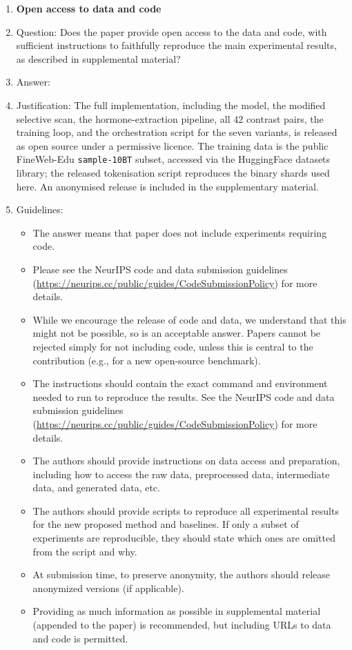 \begin{enumerate}
\item {\bf Open access to data and code}
    \item[] Question: Does the paper provide open access to the data and code, with sufficient instructions to faithfully reproduce the main experimental results, as described in supplemental material?
    \item[] Answer: \answerYes{}
    \item[] Justification: The full implementation, including the model, the modified selective scan, the hormone-extraction pipeline, all 42 contrast pairs, the training loop, and the orchestration script for the seven variants, is released as open source under a permissive licence. The training data is the public FineWeb-Edu \texttt{sample-10BT} subset, accessed via the HuggingFace datasets library; the released tokenisation script reproduces the binary shards used here. An anonymised release is included in the supplementary material.
    \item[] Guidelines:
    \begin{itemize}
        \item The answer \answerNA{} means that paper does not include experiments requiring code.
        \item Please see the NeurIPS code and data submission guidelines (\url{https://neurips.cc/public/guides/CodeSubmissionPolicy}) for more details.
        \item While we encourage the release of code and data, we understand that this might not be possible, so \answerNo{} is an acceptable answer. Papers cannot be rejected simply for not including code, unless this is central to the contribution (e.g., for a new open-source benchmark).
        \item The instructions should contain the exact command and environment needed to run to reproduce the results. See the NeurIPS code and data submission guidelines (\url{https://neurips.cc/public/guides/CodeSubmissionPolicy}) for more details.
        \item The authors should provide instructions on data access and preparation, including how to access the raw data, preprocessed data, intermediate data, and generated data, etc.
        \item The authors should provide scripts to reproduce all experimental results for the new proposed method and baselines. If only a subset of experiments are reproducible, they should state which ones are omitted from the script and why.
        \item At submission time, to preserve anonymity, the authors should release anonymized versions (if applicable).
        \item Providing as much information as possible in supplemental material (appended to the paper) is recommended, but including URLs to data and code is permitted.
    \end{itemize}



\end{enumerate}
